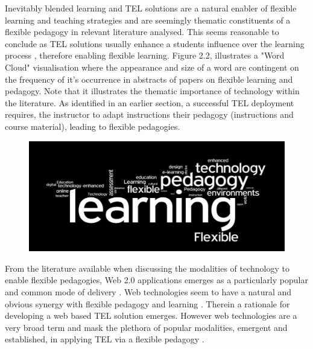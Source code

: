 Inevitably blended learning and TEL solutions  are a natural enabler of flexible learning and teaching strategies and are seemingly thematic constituents of a flexible pedagogy in relevant literature analysed. This seems reasonable to conclude as TEL solutions usually enhance a students influence over the learning process \cite{Gordon2014,Burge2011}, therefore enabling flexible learning. 
Figure 2.2, illustrates a "Word Cloud" visualisation where the appearance  and size of a word are contingent on the frequency of it's occurrence in abstracts of papers on flexible learning and pedagogy. Note that it illustrates the thematic importance of technology within the literature. As identified in an earlier section, a successful TEL deployment requires, the instructor to adapt instructions their pedagogy (instructions and course material), leading to flexible pedagogies. 

\begin{figure}[H]
	\centering
	\includegraphics[scale=0.5]{figures/wordCloud}
	\label{fig:Wordle Word Cloud}
\end{figure}



From the literature available when discussing the modalities of technology to enable flexible pedagogies, Web 2.0 applications emerges as a particularly popular and common mode of delivery \cite{Gordon2014,Burge2011}. Web technologies seem to have a natural and obvious synergy with flexible pedagogy and learning \cite{Gordon2014,Burge2011}. Therein a rationale for developing a web based TEL solution emerges. However web technologies are a very broad term and mask the plethora of popular modalities, emergent and established, in applying TEL via a flexible pedagogy \cite{Burge2011,Gordon2014,Harger1996}.


